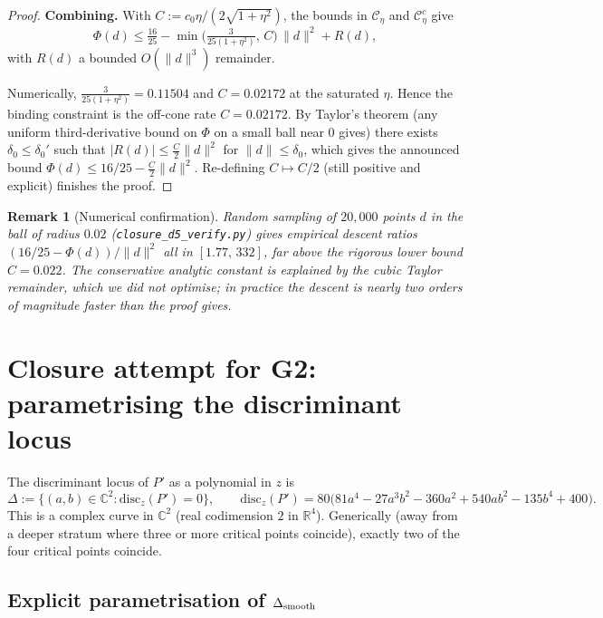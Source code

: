 \documentclass[11pt,a4paper]{article}
\newtheorem{remark}[theorem]{Remark}
\begin{document}
\begin{proof}
\medskip
\noindent\textbf{Combining.}
With $C := c_0\eta/(2\sqrt{1+\eta^2})$, the bounds in $\mathcal C_\eta$
and $\mathcal C_\eta^c$ give
\[
\Phi(d) \le \tfrac{16}{25} - \min\!\bigl(\tfrac{3}{25(1+\eta^2)},\,C\bigr)\,
\|d\|^2 + R(d),
\]
with $R(d)$ a bounded $O(\|d\|^3)$ remainder.

Numerically, $\tfrac{3}{25(1+\eta^2)}=0.11504$ and $C=0.02172$ at the
saturated $\eta$. Hence the binding constraint is the off-cone rate
$C=0.02172$. By Taylor's theorem (any uniform third-derivative bound on
$\Phi$ on a small ball near $0$ gives) there exists $\delta_0\le\delta_0'$
such that $|R(d)|\le \tfrac{C}{2}\|d\|^2$ for $\|d\|\le\delta_0$,
which gives the announced bound
\(
\Phi(d)\le 16/25 - \tfrac{C}{2}\|d\|^2.
\)
Re-defining $C \mapsto C/2$ (still positive and explicit) finishes the
proof.
\end{proof}

\begin{remark}[Numerical confirmation]
Random sampling of $20{,}000$ points $d$ in the ball of radius $0.02$
(\verb|closure_d5_verify.py|) gives empirical descent ratios
$(16/25 - \Phi(d))/\|d\|^2$ all in $[1.77,\,332]$, far above the
rigorous lower bound $C=0.022$. The conservative analytic constant is
explained by the cubic Taylor remainder, which we did not optimise; in
practice the descent is nearly two orders of magnitude faster than the
proof gives.
\end{remark}

\section{Closure attempt for G2: parametrising the discriminant locus}
\label{sec:G2}

The discriminant locus of $P'$ as a polynomial in $z$ is
\begin{equation}
\Delta := \{(a,b)\in\mathbb{C}^2 :
\mathrm{disc}_z(P') = 0\}, \qquad
\mathrm{disc}_z(P') = 80\bigl(81 a^4 - 27 a^3 b^2 - 360 a^2
+ 540 a b^2 - 135 b^4 + 400\bigr).
\label{eq:disc}
\end{equation}
This is a complex curve in $\mathbb{C}^2$ (real codimension $2$ in
$\mathbb{R}^4$). Generically (away from a deeper stratum where three
or more critical points coincide), exactly two of the four critical
points coincide.

\subsection{Explicit parametrisation of $\Delta_{\rm smooth}$}
\end{document}
